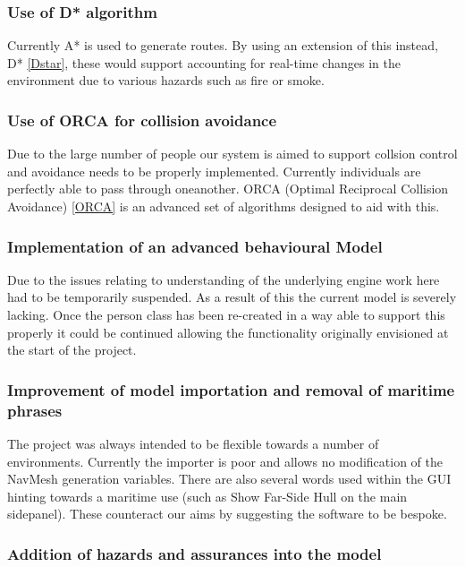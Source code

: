 \subsubsection*{Use of D{*} algorithm}

Currently A{*} is used to generate routes. By using an extension of this instead, D{*} \ref{Dstar}, these would support accounting for real-time changes in the environment due to various hazards such as fire or smoke.


\subsubsection*{Use of ORCA for collision avoidance}

Due to the large number of people our system is aimed to support collsion
control and avoidance needs to be properly implemented. Currently
individuals are perfectly able to pass through oneanother. ORCA (Optimal
Reciprocal Collision Avoidance) \ref{ORCA} is an advanced set of algorithms designed
to aid with this.


\subsubsection*{Implementation of an advanced behavioural Model}

Due to the issues relating to understanding of the underlying engine
work here had to be temporarily suspended. As a result of this the
current model is severely lacking. Once the person class has been
re-created in a way able to support this properly it could be continued
allowing the functionality originally envisioned at the start of the
project.


\subsubsection*{Improvement of model importation and removal of maritime phrases}

The project was always intended to be flexible towards a number of
environments. Currently the importer is poor and allows no modification
of the NavMesh generation variables. There are also several words
used within the GUI hinting towards a maritime use (such as Show Far-Side
Hull on the main sidepanel). These counteract our aims by suggesting
the software to be bespoke.


\subsubsection*{Addition of hazards and assurances into the model}

